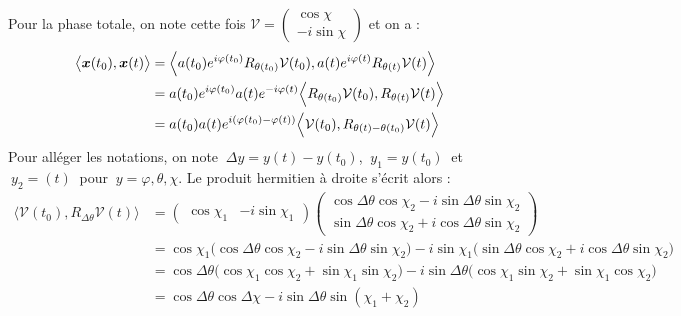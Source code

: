 \begin{annexe}
\begin{demo}
	Pour la phase totale, on note cette fois $\mathcal{V} = \begin{pmatrix} \cos\chi \\ -i\sin\chi \end{pmatrix}$ et on a :
	\begin{align*}
		\big\langle \bf{x}(t_0), \bf{x}(t)\big\rangle &= \Big\langle a(t_0)e^{i\varphi(t_0)}R_{\theta(t_0)}\mathcal{V}(t_0), a(t)e^{i\varphi(t)}R_{\theta(t)}\mathcal{V}(t) \Big\rangle \\
		&= a(t_0)e^{i\varphi(t_0)}a(t)e^{-i\varphi(t)}\Big\langle R_{\theta(t_0)}\mathcal{V}(t_0), R_{\theta(t)}\mathcal{V}(t) \Big\rangle \\
		&= a(t_0)a(t)e^{i(\varphi(t_0)-\varphi(t))}\Big\langle \mathcal{V}(t_0), R_{\theta(t)- \theta(t_0)}\mathcal{V}(t) \Big\rangle
	\end{align*}
	Pour alléger les notations, on note $\ \Delta y =y(t)-y(t_0)$, $\ y_1=y(t_0)\ $ et $\ y_2=(t)\ $ pour $\ y=\varphi,\theta,\chi$. Le produit hermitien à droite s'écrit alors :
	\begin{align*}
		\Big\langle \mathcal{V}(t_0), R_{\Delta\theta}\mathcal{V}(t) \Big\rangle &= \begin{pmatrix} \cos\chi_1 & -i\sin\chi_1 \end{pmatrix}  \begin{pmatrix} \cos\Delta\theta \cos\chi_2 - i\sin\Delta\theta \sin\chi_2 \\ \sin\Delta\theta \cos\chi_2 + i\cos\Delta\theta \sin\chi_2 \end{pmatrix} \\
		&= \cos\chi_1\Big(\cos\Delta\theta \cos\chi_2 - i\sin\Delta\theta \sin\chi_2\Big) - i\sin\chi_1\Big(\sin\Delta\theta \cos\chi_2 + i\cos\Delta\theta \sin\chi_2\Big) \\
		&= \cos\Delta\theta \Big(\cos\chi_1 \cos\chi_2 + \sin\chi_1 \sin\chi_2\Big) - i\sin\Delta\theta \Big( \cos\chi_1 \sin\chi_2 + \sin\chi_1\cos\chi_2\Big) \\
		&= \cos\Delta\theta \cos\Delta\chi - i\sin\Delta\theta \sin(\chi_1+\chi_2)
	\end{align*}
\end{demo}

\end{annexe}